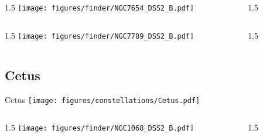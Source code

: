 \documentclass[final]{beamer}
\newlength{\colwidth}
\begin{document}

\begin{frame}[t]{}
  \begin{columns}[T]
    \begin{column}{1.5\colwidth}
      \centering
      \texttt{[image: figures/finder/NGC7654\_DSS2\_B.pdf]}
    \end{column}
    \begin{column}{1.5\colwidth}
      \Large
      
    \end{column}
  \end{columns}
  \vspace{\fill}
  \begin{columns}[T]
    \begin{column}{1.5\colwidth}
      \centering
      \texttt{[image: figures/finder/NGC7789\_DSS2\_B.pdf]}
    \end{column}
    \begin{column}{1.5\colwidth}
      \Large
      
    \end{column}
  \end{columns}
\end{frame}

\subsection{Cetus}

\begin{frame}[t]{\LARGE Cetus}
  \centering
  \texttt{[image: figures/constellations/Cetus.pdf]}
\end{frame}


\begin{frame}[t]{}
  \begin{columns}[T]
    \begin{column}{1.5\colwidth}
      \centering
      \texttt{[image: figures/finder/NGC1068\_DSS2\_B.pdf]}
    \end{column}
    \begin{column}{1.5\colwidth}
      \Large
      
    \end{column}
  \end{columns}
  \vspace{\fill}
\end{frame}
\end{document}
